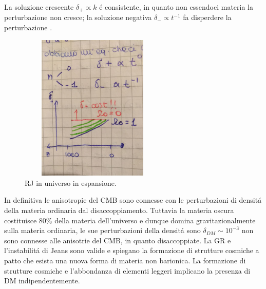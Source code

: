 \documentclass[12pt, a4paper]{article}
\begin{document}
La soluzione crescente $\delta_+\propto k$ \'{e} consistente, in quanto non essendoci materia la perturbazione non cresce; la soluzione negativa $\delta_- \propto t^{-1}$ fa disperdere la perturbazione .
\begin{figure}[htp]
    \centering
    \includegraphics[width=7cm, height=7cm]{images/milne.jpeg}
    \caption{RJ in universo in espansione.}
    \label{fig:milne}
\end{figure}
In definitiva le anisotropie del CMB sono connesse con le perturbazioni di densit\'{a} della materia ordinaria dal disaccoppiamento. Tuttavia la materia oscura costituisce $80\%$ della materia  dell'universo e dunque domina gravitazionalmente sulla materia ordinaria, le sue perturbazioni della densit\'{a} sono $\delta_{DM}\sim 10^{-3}$ non sono connesse alle anisotrie del CMB, in quanto disaccoppiate. La GR e l'instabilit\'{a} di Jeans sono valide e spiegano la formazione di strutture cosmiche a patto che  esista una nuova forma di materia non barionica. La formazione di strutture cosmiche e l'abbondanza di elementi leggeri implicano la presenza di DM indipendentemente.
\end{document}

